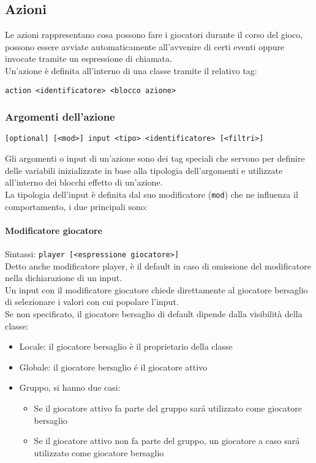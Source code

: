\subsection{Azioni}
Le azioni rappresentano cosa possono fare i giocatori durante il corso del gioco, possono essere avviate
automaticamente all'avvenire di certi eventi oppure invocate tramite un espressione di chiamata.\\
Un'azione è definita all'interno di una classe tramite il relativo tag: \\
\begin{lstlisting}
action <identificatore> <blocco azione>
\end{lstlisting}

\subsubsection{Argomenti dell'azione} \label{InputAzione}
\begin{lstlisting}
[optional] [<mod>] input <tipo> <identificatore> [<filtri>]
\end{lstlisting}
Gli argomenti o input di un’azione sono dei tag speciali che servono per definire delle variabili 
inizializzate in base alla tipologia dell’argomenti e utilizzate all’interno dei 
blocchi effetto di un’azione. \\
La tipologia dell'input è definita dal suo modificatore (\lstinline|mod|) che ne influenza il comportamento, 
i due principali sono:

\paragraph{Modificatore giocatore}
Sintassi: \lstinline|player [<espressione giocatore>]| \\
Detto anche modificatore player, è il default in caso di omissione del modificatore nella
dichiarazione di un input. \\
Un input con il modificatore giocatore chiede direttamente al giocatore bersaglio di 
selezionare i valori con cui popolare l'input. \\
Se non specificato, il giocatore bersaglio di default dipende dalla visibilità della classe:
\begin{itemize}
    \item Locale: il giocatore bersaglio è il proprietario della classe
    \item Globale: il giocatore bersaglio é il giocatore attivo 
    \item {
        Gruppo, si hanno due casi:
        \begin{itemize}
            \item Se il giocatore attivo fa parte del gruppo sará utilizzato come giocatore bersaglio
            \item Se il giocatore attivo non fa parte del gruppo, un giocatore a caso sará utilizzato come giocatore bersaglio
        \end{itemize}
    }
\end{itemize}

